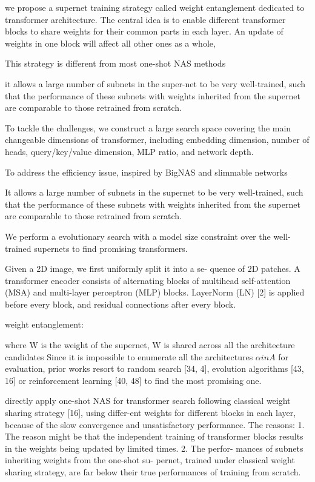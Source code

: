 \documentclass[UTF8]{article}
\begin{document}
we propose a supernet training strategy called weight entanglement dedicated to transformer architecture. The central idea is to enable different transformer blocks to share weights for their common parts in each layer. An update of weights in one block will affect all other ones as a whole,

This strategy is different from most one-shot NAS methods \cite{guo2020single, chu2021fairnas, wu2019fbnet}

it allows a large number of subnets in the super-net to be very well-trained, such that the performance of these subnets with weights inherited from the supernet are comparable to those retrained from scratch.

To tackle the challenges, we construct a large search space covering the main changeable dimensions of transformer, including embedding dimension, number of heads, query/key/value dimension, MLP ratio, and network depth.

To address the efficiency issue, inspired by BigNAS \cite{yu2020bignas} and slimmable networks \cite{yu2020bignas, yu2018slimmable}

It allows a large number of subnets in the supernet to be very well-trained, such that the performance of these subnets with weights inherited from the supernet are comparable to those retrained from scratch.

We perform a evolutionary search with a model size constraint over the well-trained supernets to find promising transformers.

Given a 2D image, we first uniformly split it into a se- quence of 2D patches. A transformer encoder consists of alternating blocks of multihead self-attention (MSA) and multi-layer perceptron (MLP) blocks. LayerNorm (LN) [2] is applied before every block, and residual connections after every block.

weight entanglement:

where W is the weight of the supernet, W is shared across all the architecture candidates
Since it is impossible to enumerate all the architectures $\alpha in A$ for evaluation, prior works resort to random search [34, 4], evolution algorithms [43, 16] or reinforcement learning [40, 48] to find the most promising one.

directly apply one-shot NAS for transformer search following classical weight sharing strategy [16], using differ-ent weights for different blocks in each layer, because of the slow convergence and unsatisfactory performance. The reasons: 1. The reason might be that the independent training of transformer blocks results in the weights being updated by limited times. 2. The perfor- mances of subnets inheriting weights from the one-shot su- pernet, trained under classical weight sharing strategy, are far below their true performances of training from scratch. 
\end{document}
